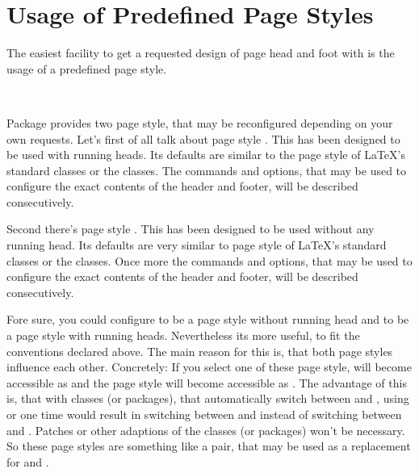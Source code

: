 \section{Usage of Predefined Page Styles}
\label{sec:scrlayer-scrpage.predefined.pagestyles}

The easiest facility to get a requested design of page head and foot with
 is the usage of a predefined page style.

\begin{Declaration}
  \\
\end{Declaration}
%
%
Package  provides two page style, that may be
reconfigured depending on your own requests. Let's first of all talk about
page style . This has been designed to be used with
running heads. Its defaults are similar to the page style
 of \LaTeX's standard classes or
the \KOMAScript{} classes. The commands and options, that may be used to
configure the exact contents of the header and footer, will be described
consecutively.

Second there's page style . This has been
designed to be used without any running head. Its defaults are very similar to
page style  of \LaTeX's standard
classes or the \KOMAScript{} classes. Once more the commands and options, that
may be used to configure the exact contents of the header and footer, will be
described consecutively.

Fore sure, you could configure  to be a page style
without running head and  to be a page style with
running heads. Nevertheless its more useful, to fit the conventions declared
above. The main reason for this is, that both page styles influence each
other. Concretely: If you select one of these page style,
 will become accessible as  and the
page style  will become accessible as
. The advantage of this is, that with classes (or packages),
that automatically switch between  and ,
using  or  one time would
result in switching between  and
 instead of switching between
 and . Patches or other adaptions of the
classes (or packages) won't be necessary. So these page styles are something
like a pair, that may be used as a replacement for  and
.

